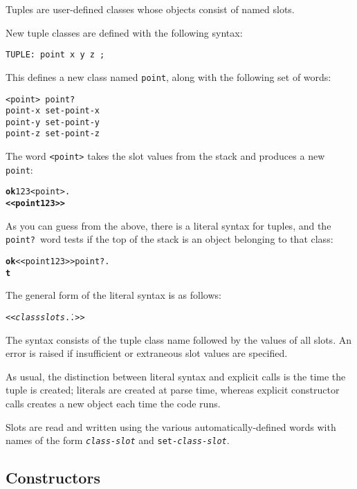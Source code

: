 \documentclass[english]{book}
\begin{document}
Tuples are user-defined classes whose objects consist of named slots.

New tuple classes are defined with the following syntax:

\begin{verbatim}
TUPLE: point x y z ;
\end{verbatim}

This defines a new class named \texttt{point}, along with the
following set of words:

\begin{verbatim}
<point> point?
point-x set-point-x
point-y set-point-y
point-z set-point-z
\end{verbatim}

The word \texttt{<point>} takes the slot values from the stack and
produces a new \texttt{point}:

\begin{alltt}
\textbf{ok} 1 2 3 <point> .
\textbf{<< point 1 2 3 >>}
\end{alltt}

As you can guess from the above, there is a literal syntax for tuples,
and the \texttt{point?}~word tests if the top of the stack is an object
belonging to that class:

\begin{alltt}
\textbf{ok} << point 1 2 3 >> point? .
\textbf{t}
\end{alltt}

The general form of the literal syntax is as follows:

\begin{alltt}
<< \emph{class} \emph{slots} \... >>
\end{alltt}

The syntax consists of the tuple class name followed by the
values of all slots. An error is raised if insufficient or extraneous slot values are specified.

As usual, the distinction between literal syntax and explicit calls is the
time the tuple is created; literals are created at parse time, whereas
explicit constructor calls creates a new object each time the code
runs.

Slots are read and written using the various automatically-defined words with names of the
form \texttt{\emph{class}-\emph{slot}} and \texttt{set-\emph{class}-\emph{slot}}.

\subsection{Constructors}
\end{document}
